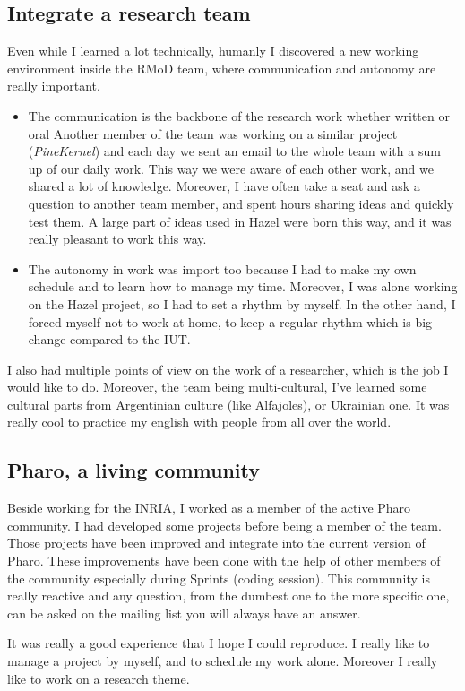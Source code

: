 \subsection{Integrate a research team}

Even while I  learned a lot technically, humanly I  discovered a new working environment inside the RMoD team, where communication and autonomy are really important.
\begin{itemize}
	\item The communication is the backbone of the research work whether written or oral Another member of the team was working on a similar project (\emph{PineKernel}) and each day we sent an email to the whole team with a sum up of our daily work. This way we were aware of each other work, and we shared a lot of knowledge. Moreover, I have often take a seat and ask a question to another team member, and spent hours sharing ideas and quickly test them. A large part of ideas used in Hazel were born this way, and it was really pleasant to work this way. 
	\item The autonomy in work was import too because I had to make my own schedule and to learn how to manage my time. Moreover, I was alone working on the Hazel project, so I had to set a rhythm by myself. In the other hand, I forced myself not to work at home, to keep a regular rhythm which is big change compared to the \gls{IUT}.
\end{itemize}

I also had multiple points of view on the work of a researcher, which is the job I would like to do. Moreover, the team being multi-cultural, I've learned some cultural parts from Argentinian culture (like Alfajoles), or Ukrainian one. It was really cool to practice my english with people from all over the world.

\subsection{Pharo, a living community}

Beside working for the \gls{INRIA}, I worked as a member of the active \gls{Pharo} community. I had developed some projects before being a member of the team. Those projects have been improved and integrate into the current version of \gls{Pharo}. These improvements have been done with the help of other members of the community especially during Sprints (coding session). This community is really reactive and any question, from the dumbest one to the more specific one, can be asked on the mailing list you will always have an answer.


\inanutshell It was really a good experience that I hope I could reproduce. I really like to manage a project by myself, and to schedule my work alone. Moreover I really like to work on a research theme.